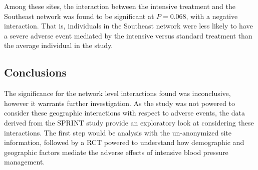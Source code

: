 \documentclass[10pt]{article}
\begin{document}
Among these sites, the interaction between the intensive treatment and the
Southeast network was found to be significant at $P = 0.068$, with a negative
interaction. That is, individuals in the Southeast network were less likely to
have a severe adverse event mediated by the intensive versus standard treatment
than the average individual in the study.

\subsection{Conclusions}
The significance for the network level interactions found was inconclusive,
however it warrants further investigation. As the study was not powered to
consider these geographic interactions with respect to adverse events, the data
derived from the SPRINT study provide an exploratory look at considering these
interactions. The first step would be analysis with the un-anonymized site
information, followed by a RCT powered to understand how demographic and
geographic factors mediate the adverse effects of intensive blood pressure
management.
\end{document}
